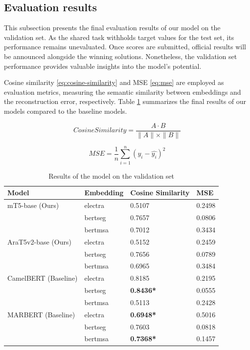 \documentclass[12.5pt]{article}
\begin{document}
\subsection{Evaluation results}

This subsection presents the final evaluation results of our model on the validation set. As the shared task withholds target values for the test set, its performance remains unevaluated. Once scores are submitted, official results will be announced alongside the winning solutions. Nonetheless, the validation set performance provides valuable insights into the model's potential.

Cosine similarity \ref{eq:cosine-similarity} and MSE \ref{eq:mse} are employed as evaluation metrics, measuring the semantic similarity between embeddings and the reconstruction error, respectively. Table \ref{table:results} summarizes the final results of our models compared to the baseline models.

\begin{equation}\label{eq:cosine-similarity}
    Cosine Similarity = \frac{A \cdot B}{\|A\| \times \|B\|}
\end{equation}

\begin{equation}\label{eq:mse}
    MSE = \frac{1}{n} \sum_{i=1}^{n} (y_i - \hat{y_i})^2
\end{equation}

\begin{table}[H]
    \centering
    \caption{Results of the model on the validation set}
    \label{table:results}
    \renewcommand{\arraystretch}{1.5}%
    \begin{tabularx}{\textwidth}{|>{\raggedright}X|>{\raggedright\arraybackslash}X|X|X|}
        \hline
        \textbf{Model} & \textbf{Embedding} & \textbf{Cosine Similarity} & \textbf{MSE} \\
        \hline
        mT5-base (Ours) & electra & 0.5107 & 0.2498 \\\cline{2-4}
        & bertseg & 0.7657 & 0.0806 \\\cline{2-4}
        & bertmsa & 0.7012 & 0.3434 \\\cline{2-4}
        \hline
        AraT5v2-base (Ours) & electra & 0.5152 & 0.2459 \\\cline{2-4}
        & bertseg & 0.7656 & 0.0789 \\\cline{2-4}
        & bertmsa & 0.6965 & 0.3484 \\\cline{2-4}
        \hline
        CamelBERT (Baseline) & electra & 0.8185 & 0.2195 \\\cline{2-4}
        & bertseg & \textbf{0.8436*} & 0.0555 \\\cline{2-4}
        & bertmsa & 0.5113 & 0.2428 \\\cline{2-4}
        \hline
        MARBERT (Baseline) & electra & \textbf{0.6948*} & 0.5016 \\\cline{2-4}
        & bertseg & 0.7603 & 0.0818 \\\cline{2-4}
        & bertmsa & \textbf{0.7368*} & 0.1457 \\\cline{2-4}
        \hline
    \end{tabularx}
\end{table}
\end{document}
